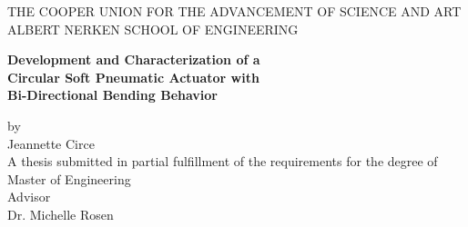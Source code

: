 \documentclass[12pt]{report}
\begin{document}
\begin{center}
\thispagestyle{empty}
\uppercase{THE COOPER UNION FOR THE ADVANCEMENT OF SCIENCE AND ART}\\[-0.9ex]
\uppercase{ALBERT NERKEN SCHOOL OF ENGINEERING}\\[-2ex]

\vspace{2cm}
\begin{center}
\vspace{0.9cm}
\textbf{\LARGE{Development and Characterization of a}} \\ 
\textbf{\LARGE{Circular Soft Pneumatic Actuator with}} \\ 
\textbf{\LARGE{Bi-Directional Bending Behavior}}
\medskip\par
\normalsize{by} \\
\Large{Jeannette Circe}\\
\vspace{4 cm}
\normalsize{A thesis submitted in partial fulfillment of the requirements for the degree of \\ Master of Engineering } \\
\vspace{3 cm}
\normalsize{Advisor}\\
\normalsize{Dr. Michelle Rosen}\\
\vspace{0.6cm}
\end{center}
\medskip
\end{center}
\clearpage




\tableofcontents
\listoffigures
\end{document}
